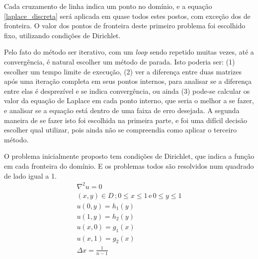 \documentclass[journal]{IEEEtran}
\begin{document}

Cada cruzamento de linha indica um ponto no domínio, e a equação \ref{laplace_discreta} será aplicada em quase todos estes postos, com exceção dos de fronteira. O valor dos pontos de fronteira deste primeiro problema foi escolhido fixo, utilizando condições de Dirichlet. 

Pelo fato do método ser iterativo, com um \textit{loop} sendo repetido muitas vezes, até a convergência, é natural escolher um método de parada. Isto poderia ser: (1) escolher um tempo limite de execução, (2) ver a diferença entre duas matrizes após uma iteração completa em seus pontos internos, para analisar se a diferença entre elas é desprezível e se indica convergência, ou ainda (3) pode-se calcular os valor da equação de Laplace em cada ponto interno, que seria o melhor a se fazer, e analisar se a equação está dentro de uma faixa de erro desejada. A segunda maneira de se fazer isto foi escolhida na primeira parte, e foi uma difícil decisão escolher qual utilizar, pois ainda não se compreendia como aplicar o terceiro método.

O problema inicialmente proposto tem condições de Dirichlet, que indica a função em cada fronteira do domínio. E os problemas todos são resolvidos num quadrado de lado igual a 1.
\begin{eqnarray}
\nabla^2 u=0 \\
(x,y) \in D\,; 0\le x\le 1\,\textrm{e}\,0\le y\le 1 \nonumber \\
u(0,y)=h_1(y) \nonumber \\
u(1,y)=h_2(y) \nonumber \\
u(x,0)=g_1(x) \nonumber \\
u(x,1)=g_2(x) \nonumber \\
\Delta x = \frac{1}{n-1} \nonumber
\end{eqnarray}
\end{document}
